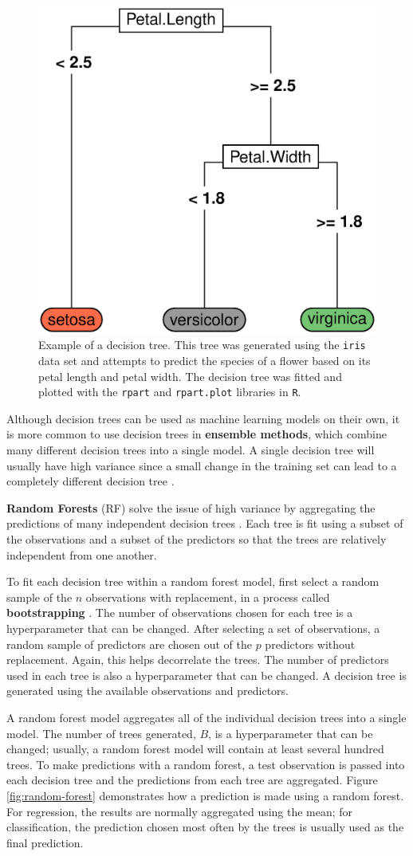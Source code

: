 \documentclass{article}
\begin{document}
\begin{figure}[h!]
	\centering
	\includegraphics[width = 0.4\linewidth]{images/decision-tree.eps}
	\captionsetup{width = 4in}
	\caption{Example of a decision tree. This tree was generated using the \lstinline!iris! data set and attempts to predict the species of a flower based on its petal length and petal width. The decision tree was fitted and plotted with the \lstinline!rpart! and \lstinline!rpart.plot! libraries in \lstinline!R!.}
	\label{fig:decision-tree}
\end{figure}

Although decision trees can be used as machine learning models on their own, it is more common to use decision trees in \textbf{ensemble methods}, which combine many different decision trees into a single model. A single decision tree will usually have high variance since a small change in the training set can lead to a completely different decision tree \cite{james2013introduction}.

\textbf{Random Forests} (RF) solve the issue of high variance by aggregating the predictions of many independent decision trees \cite{breiman2001random}. Each tree is fit using a subset of the observations and a subset of the predictors so that the trees are relatively independent from one another.

To fit each decision tree within a random forest model, first select a random sample of the $n$ observations with replacement, in a process called \textbf{bootstrapping} \cite{efron1994introduction}. The number of observations chosen for each tree is a hyperparameter that can be changed. After selecting a set of observations, a random sample of predictors are chosen out of the $p$ predictors without replacement. Again, this helps decorrelate the trees. The number of predictors used in each tree is also a hyperparameter that can be changed. A decision tree is generated using the available observations and predictors.

A random forest model aggregates all of the individual decision trees into a single model. The number of trees generated, $B$, is a hyperparameter that can be changed; usually, a random forest model will contain at least several hundred trees. To make predictions with a random forest, a test observation is passed into each decision tree and the predictions from each tree are aggregated. Figure \ref{fig:random-forest} demonstrates how a prediction is made using a random forest. For regression, the results are normally aggregated using the mean; for classification, the prediction chosen most often by the trees is usually used as the final prediction. 
\end{document}

